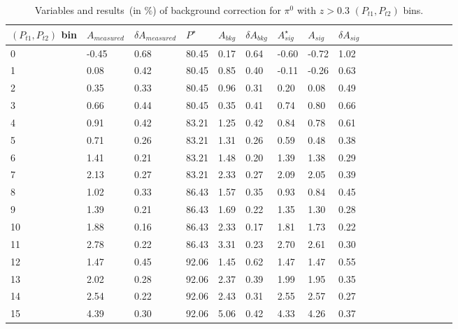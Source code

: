 \begin{table}[H]\footnotesize
\centering
\begin{tabular}{|l|l|l|l|l|l|l|l|l|l|l|l|l|l|l|l|l|l|}
\\ \hline
$(P_{t1},P_{t2})$ bin & $A_{measured}$ & $\delta A_{measured}$ & $P^{\star}$  & $A_{bkg}$ & $\delta A_{bkg}$ & $A_{sig}^{\star}$ & $ A_{sig}$  & $\delta A_{sig}$ \\ \hline
0 & -0.45 & 0.68 & 80.45 & 0.17 & 0.64 & -0.60 & -0.72 & 1.02 \\ \hline 
1 & 0.08 & 0.42 & 80.45 & 0.85 & 0.40 & -0.11 & -0.26 & 0.63 \\ \hline 
2 & 0.35 & 0.33 & 80.45 & 0.96 & 0.31 & 0.20 & 0.08 & 0.49 \\ \hline 
3 & 0.66 & 0.44 & 80.45 & 0.35 & 0.41 & 0.74 & 0.80 & 0.66 \\ \hline 
4 & 0.91 & 0.42 & 83.21 & 1.25 & 0.42 & 0.84 & 0.78 & 0.61 \\ \hline 
5 & 0.71 & 0.26 & 83.21 & 1.31 & 0.26 & 0.59 & 0.48 & 0.38 \\ \hline 
6 & 1.41 & 0.21 & 83.21 & 1.48 & 0.20 & 1.39 & 1.38 & 0.29 \\ \hline 
7 & 2.13 & 0.27 & 83.21 & 2.33 & 0.27 & 2.09 & 2.05 & 0.39 \\ \hline 
8 & 1.02 & 0.33 & 86.43 & 1.57 & 0.35 & 0.93 & 0.84 & 0.45 \\ \hline 
9 & 1.39 & 0.21 & 86.43 & 1.69 & 0.22 & 1.35 & 1.30 & 0.28 \\ \hline 
10 & 1.88 & 0.16 & 86.43 & 2.33 & 0.17 & 1.81 & 1.73 & 0.22 \\ \hline 
11 & 2.78 & 0.22 & 86.43 & 3.31 & 0.23 & 2.70 & 2.61 & 0.30 \\ \hline 
12 & 1.47 & 0.45 & 92.06 & 1.45 & 0.62 & 1.47 & 1.47 & 0.55 \\ \hline 
13 & 2.02 & 0.28 & 92.06 & 2.37 & 0.39 & 1.99 & 1.95 & 0.35 \\ \hline 
14 & 2.54 & 0.22 & 92.06 & 2.43 & 0.31 & 2.55 & 2.57 & 0.27 \\ \hline 
15 & 4.39 & 0.30 & 92.06 & 5.06 & 0.42 & 4.33 & 4.26 & 0.37 \\ \hline 
\end{tabular}
\caption{Variables and results~(in $\%$) of background correction for $\pi^0$ with $z>0.3$ $(P_{t1},P_{t2})$ bins. }
\label{tab:pi0comptbkgcor}
\end{table} 

